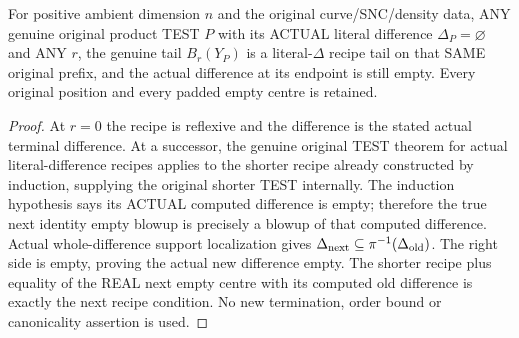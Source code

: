 \begin{theorem}
\label{hir:sharp-original-curve-terminal-difference-actual-padding}
\leanok
For positive ambient dimension $n$ and the original curve/SNC/density data, ANY genuine original product
TEST $P$ with its ACTUAL literal difference $\Delta_P=\varnothing$ and
ANY $r$, the genuine tail $B_r(Y_P)$ is a literal-$\Delta$ recipe tail
on that SAME original prefix, and the actual difference at its endpoint
is still empty. Every original position and every padded empty centre is
retained.
\end{theorem}
\begin{proof}
At $r=0$ the recipe is reflexive and the difference is the stated actual
terminal difference. At a successor, the genuine original TEST theorem for
actual literal-difference recipes applies to the shorter recipe already
constructed by induction, supplying the original shorter TEST internally.
The induction hypothesis says its ACTUAL computed difference is empty;
therefore the true next identity empty blowup is precisely a blowup of
that computed difference. Actual whole-difference support localization
gives $\Delta_{\rm next}\subseteq\pi^{-1}(\Delta_{\rm old})$.
The right side is empty, proving the actual new difference empty. The
shorter recipe plus equality of the REAL next empty centre with its
computed old difference is exactly the next recipe condition. No new
termination, order bound or canonicality assertion is used.
\end{proof}

